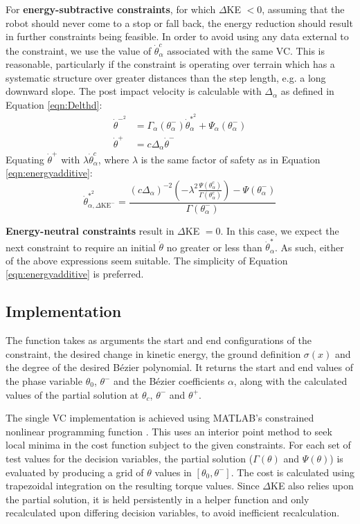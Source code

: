 For \textbf{energy-subtractive constraints}, for which $\Delta$KE $<0$, assuming that the robot should never come to a stop or fall back, the energy reduction should result in further constraints being feasible. In order to avoid using any data external to the constraint, we use the value of $\dot{\theta}_\alpha^c$ associated with the same VC. This is reasonable, particularly if the constraint is operating over terrain which has a systematic structure over greater distances than the step length, e.g. a long downward slope. The post impact velocity is calculable with $\Delta_\alpha$ as defined in Equation \ref{eqn:Delthd}:
\begin{subequations}
	\begin{align}
	\dot{\theta}^{-^2} &= \Gamma_\alpha(\theta_\alpha^-)\dot{\theta}_\alpha^{*^2} + \Psi_\alpha(\theta_\alpha^-) \\
	\dot{\theta}^+ &= c\Delta_\alpha\dot{\theta}^-
	\end{align}
\end{subequations}
Equating $\dot{\theta}^+$ with $\lambda\dot{\theta}_\alpha^c$, where $\lambda$ is the same factor of safety as in Equation \ref{eqn:energyadditive}:
\begin{equation}
	\dot{\theta}_{\alpha,\Delta\mathrm{KE}^-}^{*^2} = \frac{(c\Delta_\alpha)^{-2}\left(-\lambda^2\frac{ \Psi(\theta_\alpha^c)}{ \Gamma(\theta_\alpha^c)}\right) - \Psi(\theta_\alpha^-)} {\Gamma(\theta_\alpha^-)}
\end{equation}

\textbf{Energy-neutral constraints} result in $\Delta$KE $=0$. In this case, we expect the next constraint to require an initial $\dot{\theta}$ no greater or less than $\dot{\theta}_\alpha^*$. As such, either of the above expressions seem suitable. The simplicity of Equation \ref{eqn:energyadditive} is preferred.

\subsection{Implementation}
The  function takes as arguments the start and end configurations of the constraint, the desired change in kinetic energy, the ground definition $\sigma(x)$ and the degree of the desired Bézier polynomial. It returns the start and end values of the phase variable $\theta_0$, $\theta^-$ and the Bézier coefficients $\alpha$, along with the calculated values of the partial solution at $\theta_c$, $\theta^-$ and $\theta^+$.

The single VC implementation is achieved using MATLAB's constrained nonlinear programming function . This uses an interior point method to seek local minima in the cost function subject to the given constraints. For each set of test values for the decision variables, the partial solution ($\Gamma(\theta)$ and $\Psi(\theta)$) is evaluated by producing a grid of $\theta$ values in $[\theta_0, \theta^-]$. The cost is calculated using trapezoidal integration on the resulting torque values. Since $\Delta$KE also relies upon the partial solution, it is held persistently in a helper function and only recalculated upon differing decision variables, to avoid inefficient recalculation.

